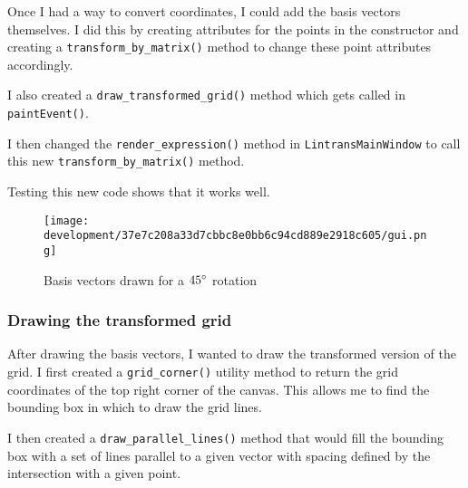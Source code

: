 \documentclass[../development.tex]{subfiles}
\begin{document}

Once I had a way to convert coordinates, I could add the basis vectors themselves. I did this by creating attributes for the points in the constructor and creating a \texttt{transform\_by\_matrix()} method to change these point attributes accordingly.


I also created a \texttt{draw\_transformed\_grid()} method which gets called in \texttt{paintEvent()}.


I then changed the \texttt{render\_expression()} method in \texttt{LintransMainWindow} to call this new \texttt{transform\_by\_matrix()} method.


Testing this new code shows that it works well.

\begin{figure}[H]
	\centering
	\texttt{[image: development/37e7c208a33d7cbbc8e0bb6c94cd889e2918c605/gui.png]}
	\caption{Basis vectors drawn for a $45\degree$ rotation}
	\label{fig:development:37e7c208a33d7cbbc8e0bb6c94cd889e2918c605:gui.png}
\end{figure}

\subsubsection{Drawing the transformed grid\label{development:visualizing-matrices:drawing-the-transformed-grid}}

After drawing the basis vectors, I wanted to draw the transformed version of the grid. I first created a \texttt{grid\_corner()} utility method to return the grid coordinates of the top right corner of the canvas. This allows me to find the bounding box in which to draw the grid lines.


I then created a \texttt{draw\_parallel\_lines()} method that would fill the bounding box with a set of lines parallel to a given vector with spacing defined by the intersection with a given point.
\end{document}
